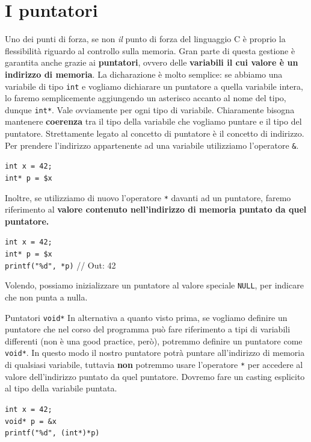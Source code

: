 \documentclass[12pt]{report}
\begin{document}
	\section{I puntatori}
	Uno dei punti di forza, se non \textit{il} punto di forza del linguaggio C è proprio la flessibilità riguardo al controllo sulla memoria.
	Gran parte di questa gestione è garantita anche grazie ai \textbf{puntatori}, ovvero delle \textbf{variabili il cui valore è un indirizzo di memoria}.
	La dicharazione è molto semplice: se abbiamo una variabile di tipo \texttt{int} e vogliamo dichiarare un puntatore a quella variabile intera, lo faremo semplicemente aggiungendo un asterisco accanto al nome del tipo, dunque \texttt{int*}. Vale ovviamente per ogni tipo di variabile. Chiaramente bisogna mantenere \textbf{coerenza} tra il tipo della variabile che vogliamo puntare e il tipo del puntatore.
	\smallbreak
	Strettamente legato al concetto di puntatore è il concetto di indirizzo. Per prendere l'indirizzo appartenente ad una variabile utilizziamo l'operatore \texttt{\&}.
	\begin{center}
		\texttt{int x = 42;}\\
		\texttt{int* p = \$x}
	\end{center}
	Inoltre, se utilizziamo di nuovo l'operatore \texttt{*} davanti ad un puntatore, faremo riferimento al \textbf{valore contenuto nell'indirizzo di memoria puntato da quel puntatore.}
	\begin{center}
		\texttt{int x = 42;}\\
		\texttt{int* p = \$x}\\
		\texttt{printf("\%d", *p)} // Out: 42
	\end{center}
	Volendo, possiamo inizializzare un puntatore al valore speciale \texttt{NULL}, per indicare che non punta a nulla.
	
	\begin{osservazione}{Puntatori \texttt{void*}}{}
		In alternativa a quanto visto prima, se vogliamo definire un puntatore che nel corso del programma può fare riferimento a tipi di variabili differenti (non è una good practice, però), potremmo definire un puntatore come \texttt{void*}.
		In questo modo il nostro puntatore potrà puntare all'indirizzo di memoria di qualsiasi variabile, tuttavia \textbf{non} potremmo usare l'operatore \texttt{*} per accedere al valore dell'indirizzo puntato da quel puntatore.
		Dovremo fare un casting esplicito al tipo della variabile puntata.
		\begin{center}
			\texttt{int x = 42;}\\
			\texttt{void* p = \&x}\\
			\texttt{printf("\%d", (int*)*p)}
		\end{center}
	\end{osservazione}
	
\end{document}
